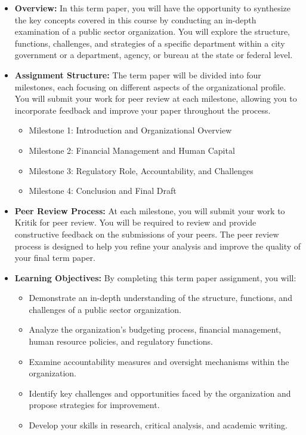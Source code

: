 \documentclass[12pt, letterpaper]{article}
\begin{document}
\begin{itemize}
    \item \textbf{Overview:} In this term paper, you will have the opportunity to synthesize the key concepts covered in this course by conducting an in-depth examination of a public sector organization. You will explore the structure, functions, challenges, and strategies of a specific department within a city government or a department, agency, or bureau at the state or federal level.
    \item \textbf{Assignment Structure:} The term paper will be divided into four milestones, each focusing on different aspects of the organizational profile. You will submit your work for peer review at each milestone, allowing you to incorporate feedback and improve your paper throughout the process.
    \begin{itemize}
        \item Milestone 1: Introduction and Organizational Overview
        \item Milestone 2: Financial Management and Human Capital
        \item Milestone 3: Regulatory Role, Accountability, and Challenges
        \item Milestone 4: Conclusion and Final Draft
    \end{itemize}
    \item \textbf{Peer Review Process:} At each milestone, you will submit your work to Kritik for peer review. You will be required to review and provide constructive feedback on the submissions of your peers. The peer review process is designed to help you refine your analysis and improve the quality of your final term paper.
    \item \textbf{Learning Objectives:} By completing this term paper assignment, you will:
        \begin{itemize}
            \item Demonstrate an in-depth understanding of the structure, functions, and challenges of a public sector organization.
            \item Analyze the organization's budgeting process, financial management, human resource policies, and regulatory functions.
            \item Examine accountability measures and oversight mechanisms within the organization.
            \item Identify key challenges and opportunities faced by the organization and propose strategies for improvement.
            \item Develop your skills in research, critical analysis, and academic writing.

\end{itemize}
\end{itemize}
\end{document}
